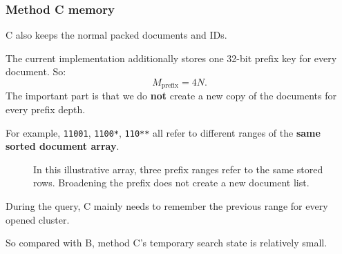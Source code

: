 
\subsubsection{Method C memory}
C also keeps the normal packed documents and IDs.

The current implementation additionally stores one 32-bit prefix key for every document. So:
\[
M_{\text{prefix}}=4N.
\]
The important part is that we do \textbf{not} create a new copy of the documents for every prefix depth.

For example, \texttt{11001}, \texttt{1100*}, \texttt{110**} all refer to different ranges of the \textbf{same sorted document array}.

\begin{figure}[htbp]\centering
{}
\caption{In this illustrative array, three prefix ranges refer to the same stored rows. Broadening the prefix does not create a new document list.}
\end{figure}

During the query, C mainly needs to remember the previous range for every opened cluster.

So compared with B, method C's temporary search state is relatively small. 
\pagebreak

